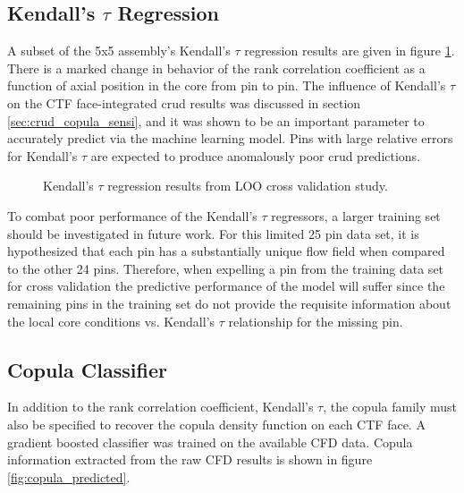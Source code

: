 \subsection{Kendall's $\tau$ Regression}

A subset of the 5x5 assembly's Kendall's $\tau$ regression results are given in figure \ref{fig:ktauregression}.  There is a marked change in behavior of the rank correlation coefficient as a function of axial position in the core from pin to pin.  The influence of Kendall's $\tau$ on the CTF face-integrated crud results was discussed in section \ref{sec:crud_copula_sensi}, and it was shown to be an important parameter to accurately predict via the machine learning model.  Pins with large relative errors for Kendall's $\tau$ are expected to produce anomalously poor crud predictions.

\begin{figure}[H]%
    \centering
    \qquad
    \qquad
    \qquad
    \qquad
    \caption[Kendall's $\tau$ regression LOO results.]{Kendall's $\tau$ regression results from LOO cross validation study.}%
    \label{fig:ktauregression}%
\end{figure}
To combat poor performance of the Kendall's $\tau$ regressors, a larger training set should be investigated in future work.  For this limited 25 pin data set, it is hypothesized that each pin has a substantially unique flow field when compared to the other 24 pins.  Therefore, when expelling a pin from the training data set for cross validation the predictive performance of the model will suffer since the remaining pins in the training set do not provide the requisite information about the local core conditions vs. Kendall's $\tau$ relationship for the missing pin.

\subsection{Copula Classifier}

In addition to the rank correlation coefficient, Kendall's $\tau$, the copula family must also be specified to recover the copula density function on each CTF face.  A gradient boosted classifier was trained on the available CFD data.  Copula information extracted from the raw CFD results is shown in figure \ref{fig:copula_predicted}.

